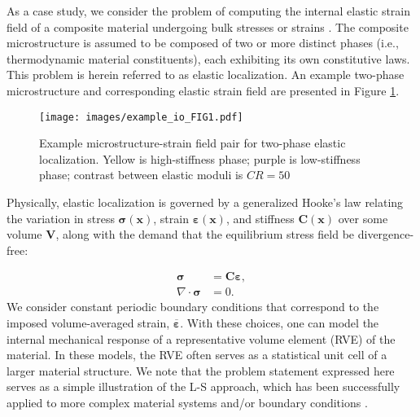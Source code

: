 \documentclass[3p, preprint]{elsarticle}
\newcommand{\bmeps}{\bm{\varepsilon}}
\newcommand{\epsavg}{\overline{\bmeps}}
\newcommand{\bmx}{\bm{x}}
\begin{document}
As a case study, we consider the problem of computing the internal elastic strain field of a composite material undergoing bulk stresses or strains \cite{moulinec1998,lebensohn2020, landi2010}. The composite microstructure is assumed to be composed of two or more distinct phases (i.e., thermodynamic material constituents), each exhibiting its own constitutive laws. This problem is herein referred to as elastic localization. An example two-phase microstructure and corresponding elastic strain field are presented in Figure \ref{fig:example_io}.

\begin{figure}
    \centering
    \texttt{[image: images/example\_io\_FIG1.pdf]}
    \caption{Example microstructure-strain field pair for two-phase elastic localization. Yellow is high-stiffness phase; purple is low-stiffness phase; contrast between elastic moduli is $CR=50$}
    \label{fig:example_io}
\end{figure}

Physically, elastic localization is governed by a generalized Hooke's law relating the variation in stress $\bm{\sigma}(\bmx)$, strain $\bmeps(\bmx)$, and stiffness $\bm{C}(\bmx)$ over some volume $\bm{V}$, along with the demand that the equilibrium stress field be divergence-free:

\begin{align}
    \bm{\sigma} &= \bm{C} \bmeps, \label{eq:const} \\
    \nabla \cdot \bm{\sigma} &= 0.
    \label{eq:hooke}
\end{align}
\noindent We consider constant periodic boundary conditions that correspond to the imposed volume-averaged strain, $\epsavg$. With these choices, one can model the internal mechanical response of a representative volume element (RVE) of the material. In these models, the RVE often serves as a statistical unit cell of a larger material structure. We note that the problem statement expressed here serves as a simple illustration of the L-S approach, which has been successfully applied to more complex material systems and/or boundary conditions \cite{lebensohn2020, brough2017}.
\end{document}
